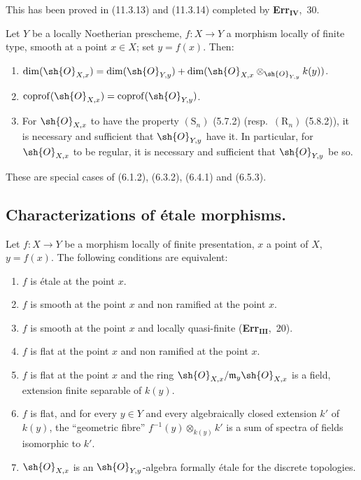 This has been proved in (11.3.13) and (11.3.14) completed by \textbf{Err}$_\textbf{IV}$,~30.

\begin{proposition}[17.5.8]
\label{IV.17.5.8}
Let $Y$ be a locally Noetherian prescheme, $f:X\to Y$ a morphism locally of finite type, smooth at a point $x\in X$; set $y=f(x)$.
Then:
\begin{enumerate}[label=(\roman*)]
  \item $\dim(\sh{O}_{X,x})=\dim(\sh{O}_{Y,y})+\dim(\sh{O}_{X,x}\otimes_{\sh{O}_{Y,y}}k(y))$.
  \item $\operatorname{coprof}(\sh{O}_{X,x})=\operatorname{coprof}(\sh{O}_{Y,y})$.
  \item For $\sh{O}_{X,x}$ to have the property $(\mathrm{S}_n)$ (5.7.2) (resp.\ $(\mathrm{R}_n)$ (5.8.2)), it is necessary and sufficient that $\sh{O}_{Y,y}$ have it.
  In particular, for $\sh{O}_{X,x}$ to be regular, it is necessary and sufficient that $\sh{O}_{Y,y}$ be so.
\end{enumerate}
\end{proposition}

These are special cases of (6.1.2), (6.3.2), (6.4.1) and (6.5.3).


\subsection{Characterizations of \'etale morphisms.}
\label{subsection:IV.17.6}


\begin{theorem}[17.6.1]
\label{IV.17.6.1}
Let $f:X\to Y$ be a morphism locally of finite presentation, $x$ a point of $X$, $y=f(x)$.
The following conditions are equivalent:
\begin{enumerate}[label=(\alph*)]
  \item $f$ is \'etale at the point $x$.
  \item[a')] $f$ is smooth at the point $x$ and non ramified at the point $x$.
  \item $f$ is smooth at the point $x$ and locally quasi-finite (\textbf{Err}$_\textbf{III}$,~20).
  \item $f$ is flat at the point $x$ and non ramified at the point $x$.
  \item[c')] $f$ is flat at the point $x$ and the ring $\sh{O}_{X,x}/\mathfrak{m}_y\sh{O}_{X,x}$ is a field, extension finite separable of $k(y)$.
  \item[c'')] $f$ is flat, and for every $y\in Y$ and every algebraically closed extension $k'$ of $k(y)$, the ``geometric fibre'' $f^{-1}(y)\otimes_{k(y)}k'$ is a sum of spectra of fields isomorphic to $k'$.
  \item $\sh{O}_{X,x}$ is an $\sh{O}_{Y,y}$-algebra formally \'etale for the discrete topologies.
\end{enumerate}
\end{theorem}

